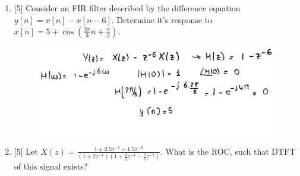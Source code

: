 \documentclass{article}
\begin{document}
\begin{enumerate}
\begin{enumerate}
        \vspace{1in}
        \item {[5]} Consider an FIR filter described by the difference equation $y[n] = x[n]-x[n-6]$. Determine it's response to $x[n] = 5 + \cos\left(\frac{2\pi}{3}n+\frac{\pi}{2}\right)$.
        \begin{figure}[H]
            \centering
            \includegraphics[width=.8\textwidth]{mt2_q1_f.png}
        \end{figure}
        \item {[5]} Let $X(z)=\frac{1+2.5z^{-1}+1.5z^{-2}}{(1+2z^{-1})\left(1+\frac{2}{5}z^{-1}-\frac{3}{5}z^{-2}\right)}$. What is the ROC, such that DTFT of this signal exists?
    \end{enumerate}


\end{enumerate}
\end{document}
